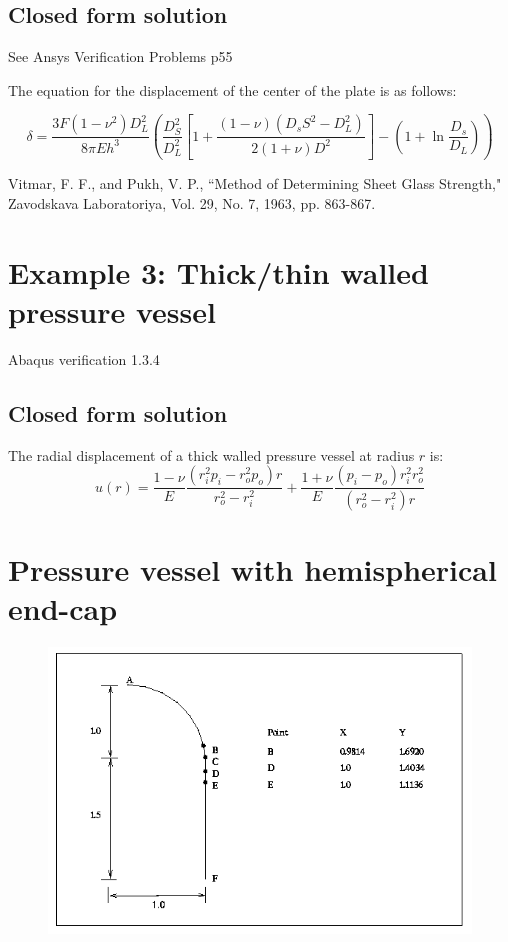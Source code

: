 \documentclass[10pt,letterpaper]{report}
\numberwithin{equation}{chapter}
\begin{document}
\section{Closed form solution}

See Ansys Verification Problems p55

The equation for the displacement of the center of the plate is as follows:

\begin{equation}
\delta=
\frac{3F(1-\nu^2)D_L^2}{8\pi Eh^3}
\left(
\frac{D_S^2}{D_L^2}\left[1+
\frac{(1-\nu)(D_sS^2-D_L^2)}{2(1+\nu)D^2}\right]
-\left(1+\ln\frac{D_s}{D_L}\right)\right)
\end{equation}

Vitmar, F. F., and Pukh, V. P., ``Method of Determining Sheet Glass
Strength," Zavodskava Laboratoriya, Vol. 29, No. 7, 1963, pp.
863-867.


\chapter{Example 3: Thick/thin walled pressure vessel}
Abaqus verification 1.3.4
\section{Closed form solution}
The radial displacement of a thick walled pressure vessel at radius $r$ is:
\begin{equation}
u(r)=\frac{1-\nu}{E}
\frac{(r_i^2p_i-r_o^2p_o)r}{r_o^2-r_i^2}+
\frac{1+\nu}{E}
\frac{(p_i-p_o)r_i^2r_o^2}{(r_o^2-r_i^2)r}
\end{equation}

\chapter{Pressure vessel with hemispherical end-cap}
\begin{figure}[!h]
\centering
\includegraphics[width=0.7\linewidth]{./PV_1}
\caption{}
\label{fig:PV_1}
\end{figure}
\end{document}
